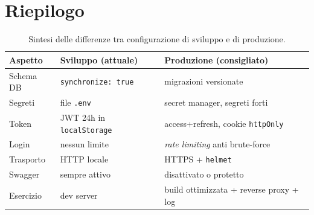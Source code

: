 \documentclass[11pt,a4paper,oneside]{report}
\newcommand{\code}[1]{\texttt{\small #1}}
\begin{document}
\section{Riepilogo}
\begin{table}[h]
\centering
\small
\renewcommand{\arraystretch}{1.25}
\begin{tabularx}{\linewidth}{@{}lXX@{}}
\toprule
\textbf{Aspetto} & \textbf{Sviluppo (attuale)} & \textbf{Produzione (consigliato)} \\
\midrule
Schema DB     & \code{synchronize: true} & migrazioni versionate \\
Segreti       & file \code{.env}         & secret manager, segreti forti \\
Token         & JWT 24h in \code{localStorage} & access+refresh, cookie \code{httpOnly} \\
Login         & nessun limite            & \emph{rate limiting} anti brute-force \\
Trasporto     & HTTP locale              & HTTPS + \code{helmet} \\
Swagger       & sempre attivo            & disattivato o protetto \\
Esercizio     & dev server               & build ottimizzata + reverse proxy + log \\
\bottomrule
\end{tabularx}
\caption{Sintesi delle differenze tra configurazione di sviluppo e di produzione.}
\end{table}
\end{document}
